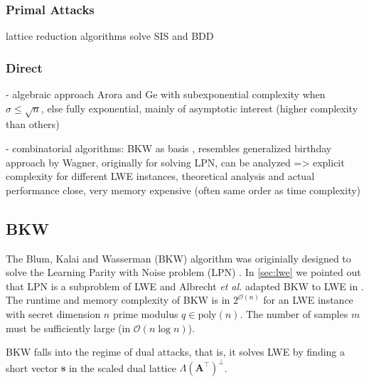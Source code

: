\subsubsection{Primal Attacks}

lattice reduction algorithms solve SIS and BDD


\subsubsection{Direct} %

- algebraic approach Arora and Ge with subexponential complexity when $\sigma \leq \sqrt{n}$, else fully exponential, mainly of asymptotic interest (higher complexity than others)


- combinatorial algorithms: BKW as basis \cite{BKW03}, resembles generalized birthday approach by Wagner, %
originally for solving LPN, can be analyzed => explicit complexity for different LWE instances, theoretical analysis and actual performance close,
very memory expensive (often same order as time complexity)



\subsection{BKW \cite{BKW03}}
The Blum, Kalai and Wasserman (BKW) algorithm was originially designed to solve the Learning Parity with Noise problem (LPN) \cite{BKW03}. In \cref{sec:lwe} we pointed out that LPN is a subproblem of LWE and Albrecht \textit{et al.} adapted BKW to LWE in \cite{ACFFP15a}. The runtime and memory complexity of BKW is in $2^{\mathcal{O}(n)}$ for an LWE instance with secret dimension $n$ prime modulus $q \in \text{poly}(n)$. The number of samples $m$ must be sufficiently large (in $\mathcal{O}(n \log n)$). %

BKW falls into the regime of dual attacks, that is, it solves LWE by finding a short vector $\mathbf{s}$ in the scaled dual lattice $\Lambda(\mathbf{A}^\intercal)^{\perp}$.


